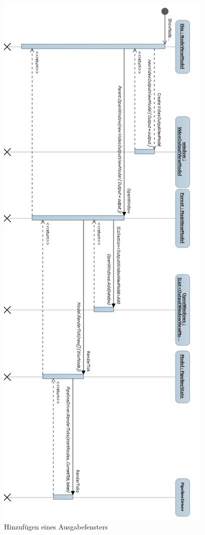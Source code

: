 \begin{figure}[h!]
\begin{center}
\includegraphics[height=0.9\textheight]{Diagrams/shownodeoutput.png}
\end{center}
\caption{Hinzufügen eines Ausgabefensters}
\end{figure}

